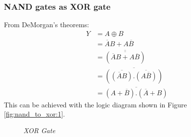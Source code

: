 		\subsubsection{NAND gates as XOR gate}
			From DeMorgan’s theorems:
			\begin{align*}
				Y &= A \oplus B \\
				  &= \overline{A}B + A\overline{B} \\
				  &= \overline{(\overline{\overline{A}B + A\overline{B}})} \\
				  &= \overline{(\overline{(\overline{A}B)} . \overline{(A\overline{B})})} \\
				  &= \overline{(A+\overline{B}) . (\overline{A} + B)}
			\end{align*}
			This can be achieved with the logic diagram shown in Figure \ref{fig:nand_to_xor:1}.
			\begin{figure}[ht]
				\centering
				\hfill
				\caption{\textit{XOR Gate}}
			\end{figure}
		
